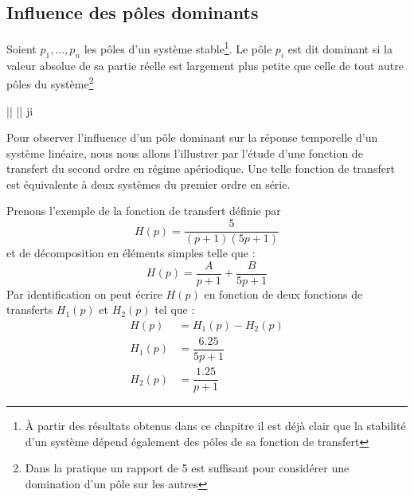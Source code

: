 \subsection{Influence des pôles dominants}
Soient $p_1,\ldots,p_n$ les pôles d'un système stable\footnote{À partir 
des résultats obtenus dans ce chapitre il est déjà clair que la stabilité
d'un système dépend également des pôles de sa fonction de transfert}.
Le pôle $p_i$ est dit dominant si la valeur absolue
de sa partie réelle est largement plus petite que celle de tout autre pôles 
du système\footnote{Dans la pratique un rapport de 5 est 
suffisant pour considérer une domination d'un pôle sur les autres}
\begin{bequation}
    \big|\big| \ll \big|\big|\;\; \forall j\neq i
\end{bequation}
Pour observer l'influence d'un pôle dominant sur 
la réponse temporelle d'un système linéaire, nous
nous allons l'illustrer par l'étude d'une fonction 
de transfert du second ordre en régime apériodique.
Une telle fonction de transfert est équivalente à deux
systèmes du premier ordre en série.

Prenons l'exemple de la fonction de transfert définie par  
\begin{equation}
H(p)=\dfrac{5}{(p+1)(5p+1)}\label{eq-ft-chap_perf}
\end{equation}
et de décomposition en éléments simples telle que :
$$
H(p)=\dfrac{A}{p+1}+\dfrac{B}{5p+1}
$$
Par identification on peut écrire $H(p)$ en fonction de
deux fonctions de transferts $H_1(p)$ et $H_2(p)$ tel que :
\begin{align*}
	H(p)&=H_1(p)-H_2(p)\\
	H_1(p)&=\dfrac{6.25}{5p+1}\\
	H_2(p)&=\dfrac{1.25}{p+1}
\end{align*}

